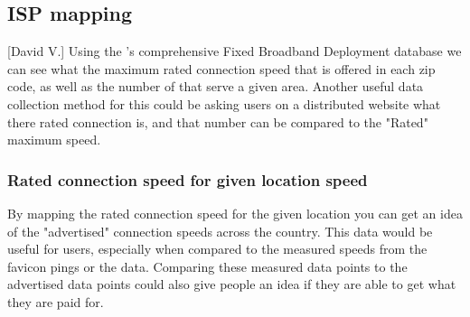 \subsection{ISP mapping}[David V.]
Using the \fcc's comprehensive Fixed Broadband Deployment database \cite{FederalCommunicationsCommission} we can see what the maximum rated connection speed that is offered in each zip code, as well as the number of \isp that serve a given area. Another useful data collection method  for this could be asking users on a distributed website what there rated connection is, and that number can be compared to the "Rated" maximum speed. 

\subsubsection{Rated connection speed for given location speed}
By mapping the rated connection speed for the given location you can get an idea of the "advertised" connection speeds across the country. This data would be useful for users, especially when compared to the measured speeds from the favicon pings or the \caida data. Comparing these measured data points to the advertised data points could also give people an idea if they are able to get what they are paid for.  
